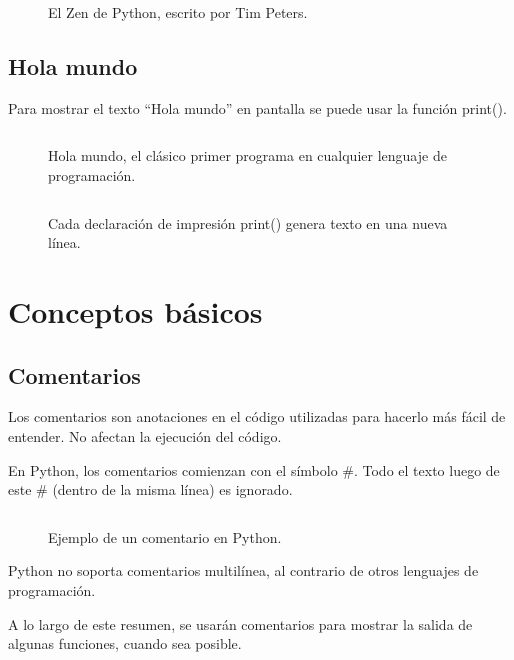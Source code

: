 \documentclass{article}
\newcommand{\doble}[1]{``#1''}
\begin{document}
\begin{figure}[ht!]
  \inputminted[frame=single, linenos]{text}{codigo/1-intro/zen.txt}
  \caption{El Zen de Python, escrito por Tim Peters.}
\end{figure}

\subsection{Hola mundo}

Para mostrar el texto \doble{Hola mundo} en pantalla se puede usar la función print().

\begin{figure}[ht!]
  \inputminted[frame=single, linenos]{python}{codigo/1-intro/hola_mundo_1.py}
  \caption{Hola mundo, el clásico primer programa en cualquier lenguaje de programación.}
\end{figure}

\begin{figure}[ht!]
  \inputminted[frame=single, linenos]{python}{codigo/1-intro/hola_mundo_2.py}
  \caption{Cada declaración de impresión print() genera texto en una nueva línea.}
\end{figure}

\newpage
\section{Conceptos básicos}

\subsection{Comentarios}

Los comentarios son anotaciones en el código utilizadas para hacerlo más fácil de entender. No afectan la ejecución del código.

En Python, los comentarios comienzan con el símbolo \#. Todo el texto luego de este \# (dentro de la misma línea) es ignorado.

\begin{figure}[ht!]
  \inputminted[frame=single, linenos]{python}{codigo/2-basico/comentario.py}
  \caption{Ejemplo de un comentario en Python.}
\end{figure}

Python no soporta comentarios multilínea, al contrario de otros lenguajes de programación.

A lo largo de este resumen, se usarán comentarios para mostrar la salida de algunas funciones, cuando sea posible.
\end{document}
